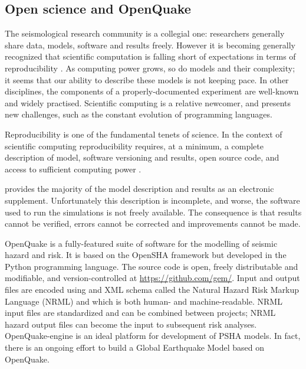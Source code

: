 \documentclass{article}
\begin{document}
\subsection{Open science and OpenQuake}
\label{subsec:Open}

The seismological research community is a collegial one: researchers generally share data, models, software and results freely.
However it is becoming generally recognized that scientific computation is falling short of expectations in terms of reproducibility \citep{fomel2009reproducible, donoho2009reproducible}.
As computing power grows, so do models and their complexity; it seems that our ability to describe these models is not keeping pace.
In other disciplines, the components of a properly-documented experiment are well-known and widely practised.
Scientific computing is a relative newcomer, and presents new challenges, such as the constant evolution of programming languages.

Reproducibility is one of the fundamental tenets of science.
In the context of scientific computing reproducibility requires, at a minimum, a complete description of model, software versioning and results, open source code, and access to sufficient computing power \citep{hinsen2011data}.

\cite{nath2012probabilistic} provides the majority of the model description and results as an electronic supplement.
Unfortunately this description is incomplete, and worse, the software used to run the simulations is not freely available.
The consequence is that results cannot be verified, errors cannot be corrected and improvements cannot be made.

OpenQuake \citep{pagani2014openquake} is a fully-featured suite of software for the modelling of seismic hazard and risk. 
It is based on the OpenSHA framework \citep{field2003opensha} but developed in the Python programming language.
The source code is open, freely distributable and modifiable, and version-controlled at \url{https://github.com/gem/}.
Input and output files are encoded using and XML schema called the Natural Hazard Risk Markup Language (NRML) and which is both human- and machine-readable. 
NRML input files are standardized and can be combined between projects; NRML hazard output files can become the input to subsequent risk analyses.
OpenQuake-engine is an ideal platform for development of PSHA models.
In fact, there is an ongoing effort to build a Global Earthquake Model \citep{pagani2014openquake} based on OpenQuake.
\end{document}
